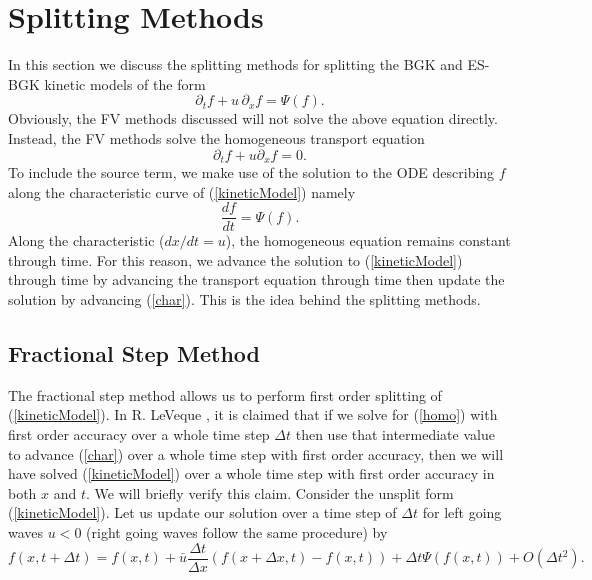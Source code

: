 \section{Splitting Methods}
In this section we discuss the splitting methods for splitting the BGK and ES-BGK kinetic models of the form
%
\begin{equation}
\label{kineticModel}
\partial_t f + u \, \partial_x f = \Psi (f).
\end{equation}
%
Obviously, the FV methods discussed will not solve the above equation directly. Instead, the FV methods solve the homogeneous transport equation
%
\begin{equation}
\label{homo}
\partial_t f + u \partial_x f = 0.
\end{equation}
%
To include the source term, we make use of the solution to the ODE describing $f$ along the characteristic curve of (\ref{kineticModel}) namely
%
\begin{equation}
\label{char}
\frac{df}{dt} = \Psi (f).
\end{equation}
%
Along the characteristic ($dx/dt = u$), the homogeneous equation remains constant through time. For this reason, we advance the solution to (\ref{kineticModel}) through time by advancing the transport equation through time then update the solution by advancing (\ref{char}). This is the idea behind the splitting methods.
\subsection{Fractional Step Method}
The fractional step method allows us to perform first order splitting of (\ref{kineticModel}).
In R. LeVeque \cite{leveque}, it is claimed that if we solve for (\ref{homo}) with first order accuracy over a whole time step $\Delta t$ then use that intermediate value to advance (\ref{char}) over a whole time step with first order accuracy, then we will have solved (\ref{kineticModel}) over a whole time step with first order accuracy in both $x$ and $t$. We will briefly verify this claim. Consider the unsplit form (\ref{kineticModel}). Let us update our solution over a time step of $\Delta t$ for left going waves $u<0$ (right going waves follow the same procedure) by
%
\begin{equation}
\label{firstOrderUnsplit}
f(x,t+\Delta t) = f(x,t) + \bar{u} \frac{\Delta t}{\Delta x} \left(f(x+\Delta x,t) - f(x,t)\right) + \Delta t \Psi(f(x,t)) + O(\Delta t^2).
\end{equation}
%

